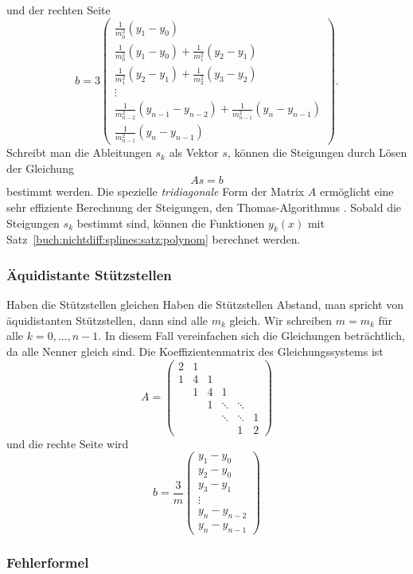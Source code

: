 und der rechten Seite
\[
\renewcommand{\arraystretch}{1.9}
b
=
3
\begin{pmatrix}
\displaystyle
\frac{1}{m_0^2}(y_1-y_0)
\\
\displaystyle
\frac{1}{m_0^2}(y_1-y_0)
+
\frac{1}{m_1^2}(y_2-y_1)
\\
\displaystyle
\frac{1}{m_1^2}(y_2-y_1)
+
\frac{1}{m_2^2}(y_3-y_2)
\\
\vdots
\\
\displaystyle
\frac{1}{m_{n-2}^2}(y_{n-1}-y_{n-2})
+
\frac{1}{m_{n-1}^2}(y_n-y_{n-1})
\\
\displaystyle
\frac{1}{m_{n-1}^2}(y_n-y_{n-1})
\end{pmatrix}.
\]
Schreibt man die Ableitungen $s_k$ als Vektor $s$, können die Steigungen
durch Lösen der Gleichung
\[
As=b
\]
bestimmt werden.
Die spezielle {\em tridiagonale} Form der Matrix $A$
%
ermöglicht eine sehr effiziente Berechnung der Steigungen, den
Thomas-Algorithmus \cite{buch:thomas}.
%
Sobald die Steigungen $s_k$ bestimmt sind, können die Funktionen
$y_k(x)$ mit Satz~\ref{buch:nichtdiff:splines:satz:polynom}
berechnet werden.

%
%
\subsubsection{Äquidistante Stützstellen}
Haben die Stützstellen gleichen Haben die Stützstellen Abstand, man
spricht von äquidistanten Stützstellen, dann sind alle $m_k$ gleich.
Wir schreiben $m=m_k$ für alle $k=0,\dots,n-1$.
In diesem Fall vereinfachen sich die Gleichungen beträchtlich, da
alle Nenner gleich sind.
Die Koeffizientenmatrix des Gleichungssystems ist
\[
A
=
\begin{pmatrix}
2 &1 &  &       &       &  \\
1 &4 &1 &       &       &  \\
  &1 &4 &1      &       &  \\[-3pt]
  &  &1 &\ddots &\ddots &  \\[-3pt]
  &  &  &\ddots &\ddots &1 \\
  &  &  &       &1      &2
\end{pmatrix}
\]
und die rechte Seite wird
\[
b
=
\frac{3}{m}
\begin{pmatrix}
y_1-y_0\\
y_2-y_0\\
y_3-y_1\\[-3pt]
\vdots\\
y_n-y_{n-2}\\
y_n-y_{n-1}
\end{pmatrix}
\]

%
%
\subsubsection{Fehlerformel}

